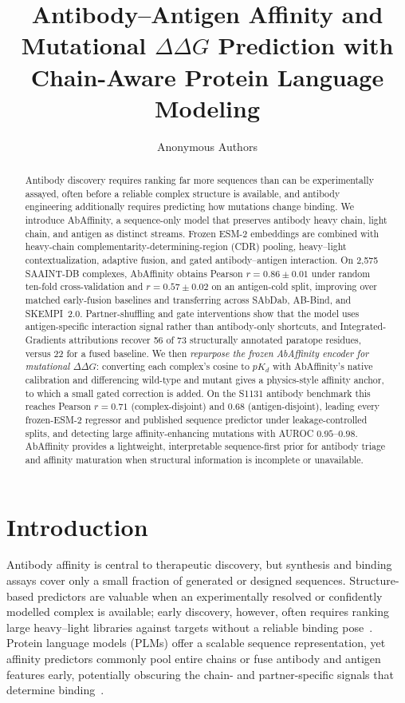 \documentclass{article}
\title{Antibody--Antigen Affinity and Mutational $\Delta\Delta G$ Prediction with Chain-Aware Protein Language Modeling}
\author{Anonymous Authors}
\newcommand{\ddg}{\ensuremath{\Delta\Delta G}}
\newcommand{\pkd}{\ensuremath{pK_d}}
\begin{document}
\maketitle

\begin{abstract}
Antibody discovery requires ranking far more sequences than can be experimentally assayed, often before a reliable complex structure is available, and antibody engineering additionally requires predicting how mutations change binding. We introduce AbAffinity, a sequence-only model that preserves antibody heavy chain, light chain, and antigen as distinct streams. Frozen ESM-2 embeddings are combined with heavy-chain complementarity-determining-region (CDR) pooling, heavy--light contextualization, adaptive fusion, and gated antibody--antigen interaction. On 2{,}575 SAAINT-DB complexes, AbAffinity obtains Pearson $r=0.86\pm0.01$ under random ten-fold cross-validation and $r=0.57\pm0.02$ on an antigen-cold split, improving over matched early-fusion baselines and transferring across SAbDab, AB-Bind, and SKEMPI~2.0. Partner-shuffling and gate interventions show that the model uses antigen-specific interaction signal rather than antibody-only shortcuts, and Integrated-Gradients attributions recover 56 of 73 structurally annotated paratope residues, versus 22 for a fused baseline. We then \emph{repurpose the frozen AbAffinity encoder for mutational \ddg{}}: converting each complex's cosine to \pkd{} with AbAffinity's native calibration and differencing wild-type and mutant gives a physics-style affinity anchor, to which a small gated correction is added. On the S1131 antibody benchmark this reaches Pearson $r=0.71$ (complex-disjoint) and $0.68$ (antigen-disjoint), leading every frozen-ESM-2 regressor and published sequence predictor under leakage-controlled splits, and detecting large affinity-enhancing mutations with AUROC $0.95$--$0.98$. AbAffinity provides a lightweight, interpretable sequence-first prior for antibody triage and affinity maturation when structural information is incomplete or unavailable.
\end{abstract}

\section{Introduction}
Antibody affinity is central to therapeutic discovery, but synthesis and binding assays cover only a small fraction of generated or designed sequences. Structure-based predictors are valuable when an experimentally resolved or confidently modelled complex is available; early discovery, however, often requires ranking large heavy--light libraries against targets without a reliable binding pose~\citep{dunbar2014sabdab,sirin2016ab,jankauskaite2019skempi}. Protein language models (PLMs) offer a scalable sequence representation, yet affinity predictors commonly pool entire chains or fuse antibody and antigen features early, potentially obscuring the chain- and partner-specific signals that determine binding~\citep{lin2023evolutionary,jin2024attabseq,wang2024antiformer}.
\end{document}
